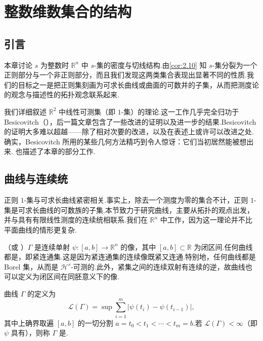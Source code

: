 
\chapter{整数维数集合的结构}\label{chap:3}

\section{引言}

本章讨论 $s$ 为整数时 $\mathbb{R}^n$ 中 $s$-集的密度与切线结构.由\cref{cor:2.10} 知 $s$-集分裂为一个正则部分与一个非正则部分，而且我们发现这两类集合表现出显著不同的性质.我们的目标之一是把正则集刻画为可求长曲线或曲面的可数并的子集，从而把测度论的观念与描述性的拓扑观念联系起来.

我们详细叙述 $\mathbb{R}^2$ 中线性可测集（即 $1$-集）的理论.这一工作几乎完全归功于 Besicovitch（\citeyear{besicovitch1928a,besicovitch1938}），后一篇文章包含了一些改进的证明以及进一步的结果.Besicovitch 的证明大多难以超越——除了相对次要的改进，以及在表述上或许可以改进之处.确实，Besicovitch 所用的某些几何方法精巧到令人惊讶：它们当初居然能被想出来.\textcite{deguzman1981} 也描述了本章的部分工作.

\section{曲线与连续统}

正则 $1$-集与可求长曲线紧密相关.事实上，除去一个测度为零的集合不计，正则 $1$-集是可求长曲线的可数族的子集.本节致力于研究曲线，主要从拓扑的观点出发，并与具有有限线性测度的连续统相联系.我们在 $\mathbb{R}^n$ 中工作，因为这一理论并不比平面曲线的情形更复杂.

（或 ）$\Gamma$ 是连续单射 $\psi:[a,b]\to\mathbb{R}^n$ 的像，其中 $[a,b]\subset\mathbb{R}$ 为闭区间.任何曲线都是，即紧连通集.这是因为紧连通集的连续像既紧又连通.特别地，任何曲线都是 Borel 集，从而是 $\mathcal{H}^s$-可测的.此外，紧集之间的连续双射有连续的逆，故曲线也可以定义为闭区间在同胚意义下的像.

曲线 $\Gamma$ 的定义为
\begin{equation}\label{eq:3.1}
  \mathscr{L}(\Gamma)=\sup\sum_{i=1}^{m}|\psi(t_i)-\psi(t_{i-1})|,
\end{equation}
其中上确界取遍 $[a,b]$ 的一切分割 $a=t_0<t_1<\cdots<t_m=b$.若 $\mathscr{L}(\Gamma)<\infty$（即 $\psi$ 具有），则称 $\Gamma$ 是.

